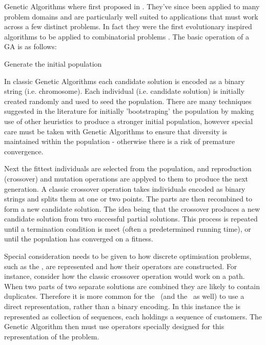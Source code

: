 Genetic Algorithms where first proposed in \cite{Holland:1975}. They've since been applied to many problem domains and are particularly well suited to applications that must work across a few distinct problems. In fact they were the first evolutionary inspired algorithms to be applied to combinatorial problems \cite{Potvin:2009}. The basic operation of a GA is as follows:

\begin{algorithm}
    Generate the initial population\\
\end{algorithm}

In classic Genetic Algorithms each candidate solution is encoded as a binary string (i.e. chromosome). Each individual (i.e. candidate solution) is initially created randomly and used to seed the population. There are many techniques suggested in the literature for initially 'bootstraping' the population by making use of other heuristics to produce a stronger initial population, however special care must be taken with Genetic Algorithms to ensure that diversity is maintained within the population - otherwise there is a risk of premature convergence. 

Next the fittest individuals are selected from the population, and reproduction (crossover) and mutation operations are applyed to them to produce the next generation. A classic crossover operation takes individuals encoded as binary strings and splits them at one or two points. The parts are then recombined to form a new candidate solution. The idea being that the crossover produces a new candidate solution from two successful partial solutions. This process is repeated until a termination condition is meet (often a predetermined running time), or until the population has converged on a fitness.

Special consideration needs to be given to how discrete optimisation problems, such as the \VRP, are represented and how their operators are constructed. For instance, consider how the classic crossover operation would work on a \TSP path. When two parts of two separate solutions are combined they are likely to contain duplicates. Therefore it is more common for the \VRP\ (and the \TSP\ as well) to use a direct representation, rather than a binary encoding. In this instance the \VRP is represented as collection of sequences, each holdings a sequence of customers. The Genetic Algorithm then must use operators specially designed for this representation of the problem. 

